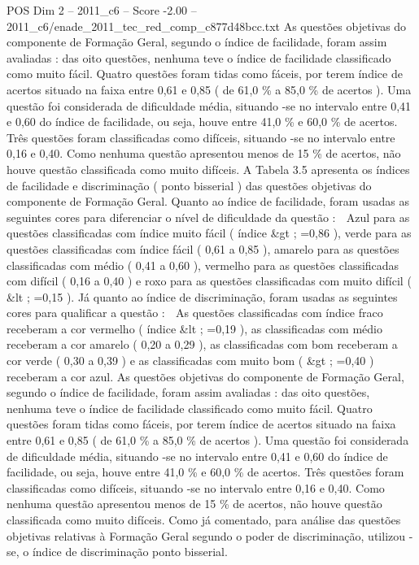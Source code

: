 \begin{textsample}{POS Dim 2 – 2011\_c6 – Score -2.00 – 2011\_c6/enade\_2011\_tec\_red\_comp\_c877d48bcc.txt}
As questões objetivas do componente de Formação Geral, segundo o índice de facilidade, foram assim avaliadas : das oito questões, nenhuma teve o índice de facilidade classificado como muito fácil.
Quatro questões foram tidas como fáceis, por terem índice de acertos situado na faixa entre 0,61 e 0,85 ( de 61,0 \% a 85,0 \% de acertos ).
Uma questão foi considerada de dificuldade média, situando -se no intervalo entre 0,41 e 0,60 do índice de facilidade, ou seja, houve entre 41,0 \% e 60,0 \% de acertos.
Três questões foram classificadas como difíceis, situando -se no intervalo entre 0,16 e 0,40.
Como nenhuma questão apresentou menos de 15 \% de acertos, não houve questão classificada como muito difíceis.
A Tabela 3.5 apresenta os índices de facilidade e discriminação ( ponto bisserial ) das questões objetivas do componente de Formação Geral.
Quanto ao índice de facilidade, foram usadas as seguintes cores para diferenciar o nível de dificuldade da questão :  Azul para as questões classificadas com índice muito fácil ( índice \&gt ; =0,86 ), verde para as questões classificadas com índice fácil ( 0,61 a 0,85 ), amarelo para as questões classificadas com médio ( 0,41 a 0,60 ), vermelho para as questões classificadas com difícil ( 0,16 a 0,40 ) e roxo para as questões classificadas com muito difícil ( \&lt ; =0,15 ).
Já quanto ao índice de discriminação, foram usadas as seguintes cores para qualificar a questão :  As questões classificadas com índice fraco receberam a cor vermelho ( índice \&lt ; =0,19 ), as classificadas com médio receberam a cor amarelo ( 0,20 a 0,29 ), as classificadas com bom receberam a cor verde ( 0,30 a 0,39 ) e as classificadas com muito bom ( \&gt ; =0,40 ) receberam a cor azul.
As questões objetivas do componente de Formação Geral, segundo o índice de facilidade, foram assim avaliadas : das oito questões, nenhuma teve o índice de facilidade classificado como muito fácil.
Quatro questões foram tidas como fáceis, por terem índice de acertos situado na faixa entre 0,61 e 0,85 ( de 61,0 \% a 85,0 \% de acertos ).
Uma questão foi considerada de dificuldade média, situando -se no intervalo entre 0,41 e 0,60 do índice de facilidade, ou seja, houve entre 41,0 \% e 60,0 \% de acertos.
Três questões foram classificadas como difíceis, situando -se no intervalo entre 0,16 e 0,40.
Como nenhuma questão apresentou menos de 15 \% de acertos, não houve questão classificada como muito difíceis.
Como já comentado, para análise das questões objetivas relativas à Formação Geral segundo o poder de discriminação, utilizou -se, o índice de discriminação ponto bisserial.

\end{textsample}
